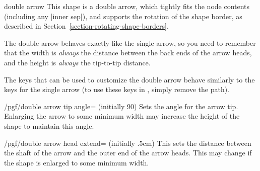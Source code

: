 \begin{shape}{double arrow}
    This shape is a double arrow, which tightly fits the node contents
    (including any |inner sep|), and supports the rotation of the shape border,
    as described in Section~\ref{section-rotating-shape-borders}.
\begin{codeexample}[preamble={\usetikzlibrary{shapes.arrows}}]
\end{codeexample}

    The double arrow behaves exactly like the single arrow, so you need to
    remember that the width is \emph{always} the distance between the back ends
    of the arrow heads, and the height is \emph{always} the tip-to-tip
    distance.
\begin{codeexample}[preamble={\usetikzlibrary{shapes.arrows}}]
\end{codeexample}

    The \pgfname{} keys that can be used to customize the double arrow behave
    similarly to the keys for the single arrow (to use these keys in
    \tikzname{}, simply remove the  path).

    \begin{key}{/pgf/double arrow tip angle= (initially 90)}
        Sets the angle for the arrow tip. Enlarging the arrow to some minimum
        width may increase the height of the shape to maintain this angle.
    \end{key}

    \begin{key}{/pgf/double arrow head extend= (initially .5cm)}
        This sets the distance between the shaft of the arrow and the outer end
        of the arrow heads. This may change if the shape is enlarged to some
        minimum width.
    \end{key}


\end{shape}
